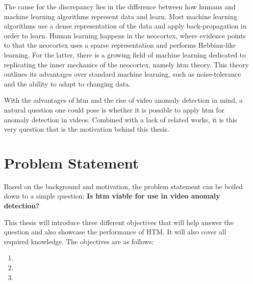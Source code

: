 \par
The cause for the discrepancy lies in the difference between how humans and machine learning algorithms represent data and learn. Most machine learning algorithms use a dense representation of the data and apply back-propagation in order to learn. Human learning happens in the neocortex, where evidence points to that the neocortex uses a sparse representation and performs Hebbian-like~\cite{hebbian_learning} learning. For the latter, there is a growing field of machine learning dedicated to replicating the inner mechanics of the neocortex, namely  \gls*{htm} theory. This theory outlines its advantages over standard machine learning, such as noise-tolerance and the ability to adapt to changing data.
\par
With the advantages of  \gls*{htm} and the rise of video anomaly detection in mind, a natural question one could pose is whether it is possible to apply  \gls*{htm} for anomaly detection in videos. Combined with a lack of related works, it is this very question that is the motivation behind this thesis.

\section{Problem Statement}
\label{sec:problem_statement}
Based on the background and motivation, the problem statement can be boiled down to a simple question: \textbf{Is \gls*{htm} viable for use in video anomaly detection?}\par
This thesis will introduce three different objectives that will help answer the question and also showcase the performance of HTM. It will also cover all required knowledge. The objectives are as follows:
\begin{enumerate}
    \item {}
    \item {}
    \item {}
\end{enumerate}

